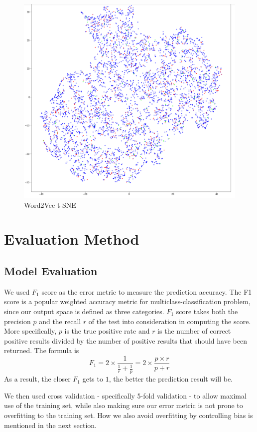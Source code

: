 \documentclass[letterpaper, 12 pt, conference]{ieeeconf}  %
\begin{document}
\begin{figure}[h]
	\centering
	\includegraphics[scale=0.1]{word2vec_tsne.png}
	\caption{Word2Vec t-SNE}
    \label{w2v_tsne}
\end{figure}

\section{Evaluation Method}
\subsection{Model Evaluation}
We used $F_1$ score as the error metric to measure the prediction accuracy. The F1 score is a popular weighted accuracy metric for multiclass-classification problem, since our output space is defined as three categories. $F_1$ score takes both the precision $p$ and the recall $r$ of the test into consideration in computing the score. More specifically,  $p$ is the true positive rate and $r$ is the number of correct positive results divided by the number of positive results that should have been returned. The formula is $$F_1 = 2 \times \frac{1}{\frac{1}{r}+\frac{1}{p}} = 2 \times \frac{p\times r}{p + r}$$ As a result, the closer $F_1$ gets to $1$, the better the prediction result will be.

We then used cross validation - specifically 5-fold validation - to allow maximal use of the training set, while also making sure our error metric is not prone to overfitting to the training set. How we also avoid overfitting by controlling bias is mentioned in the next section.
\end{document}
